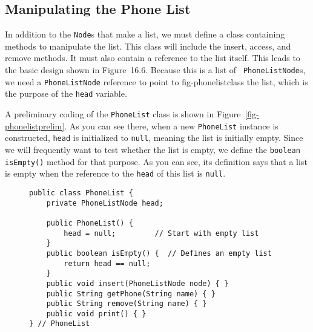 \subsection{Manipulating the Phone List}

\noindent In addition to the {\tt Node}s that make a list, we must define a
class containing methods to manipulate the list.  This class will
include the insert, access, and remove methods.  It must also contain
a reference to the list itself.  This leads to the basic design shown
in Figure~16.6. Because this is a list of {\tt
PhoneListNode}s, we need a {\tt PhoneListNode} reference to point to
{fig-phonelistclass}
the list, which is the purpose of the {\tt head} variable.


A preliminary coding of the {\tt PhoneList} class is shown in
Figure~\ref{fig-phonelistprelim}.  As you can see there, when a new
{\tt PhoneList} instance is constructed, {\tt head} is initialized to
{\tt null}, meaning the list is initially empty.
Since we will frequently want to test whether the list is empty, we
define the {\tt boolean} {\tt isEmpty()} method for that purpose.  As
you can see, its definition says that a list is empty when the
reference to the {\tt head} of this list is {\tt null}.


\begin{figure}[hbt]
\jjjprogstart
\begin{jjjlisting}
\begin{lstlisting}
public class PhoneList {
    private PhoneListNode head;

    public PhoneList() {
        head = null;         // Start with empty list
    }
    public boolean isEmpty() {  // Defines an empty list
        return head == null;
    }
    public void insert(PhoneListNode node) { }
    public String getPhone(String name) { }
    public String remove(String name) { }
    public void print() { }
} // PhoneList
\end{lstlisting}
\end{jjjlisting}
\end{figure}


